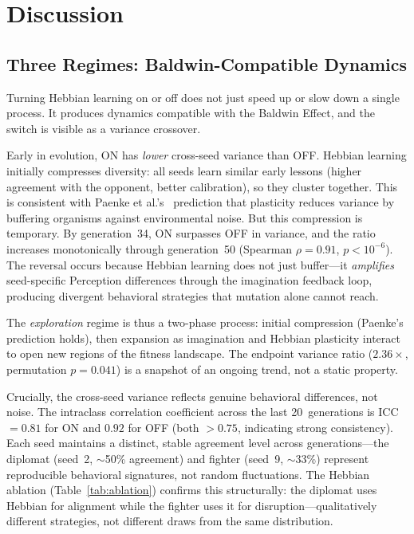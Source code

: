 \documentclass[11pt,a4paper]{article}
\begin{document}
\section{Discussion}

\subsection{Three Regimes: Baldwin-Compatible Dynamics}

Turning Hebbian learning on or off does not just speed up or slow down a single process.
It produces dynamics compatible with the Baldwin Effect, and the switch is visible as a variance crossover.

Early in evolution, ON has \emph{lower} cross-seed variance than OFF.
Hebbian learning initially compresses diversity: all seeds learn similar early lessons (higher agreement with the opponent, better calibration), so they cluster together.
This is consistent with Paenke et al.'s~\citep{paenke2009baldwin} prediction that plasticity reduces variance by buffering organisms against environmental noise.
But this compression is temporary.
By generation~34, ON surpasses OFF in variance, and the ratio increases monotonically through generation~50 (Spearman $\rho = 0.91$, $p < 10^{-6}$).
The reversal occurs because Hebbian learning does not just buffer---it \emph{amplifies} seed-specific Perception differences through the imagination feedback loop, producing divergent behavioral strategies that mutation alone cannot reach.

The \emph{exploration} regime is thus a two-phase process: initial compression (Paenke's prediction holds), then expansion as imagination and Hebbian plasticity interact to open new regions of the fitness landscape.
The endpoint variance ratio ($2.36\times$, permutation $p = 0.041$) is a snapshot of an ongoing trend, not a static property.

Crucially, the cross-seed variance reflects genuine behavioral differences, not noise.
The intraclass correlation coefficient across the last 20~generations is ICC $= 0.81$ for ON and $0.92$ for OFF (both $> 0.75$, indicating strong consistency).
Each seed maintains a distinct, stable agreement level across generations---the diplomat (seed~2, $\sim$50\% agreement) and fighter (seed~9, $\sim$33\%) represent reproducible behavioral signatures, not random fluctuations.
The Hebbian ablation (Table~\ref{tab:ablation}) confirms this structurally: the diplomat uses Hebbian for alignment while the fighter uses it for disruption---qualitatively different strategies, not different draws from the same distribution.
\end{document}
